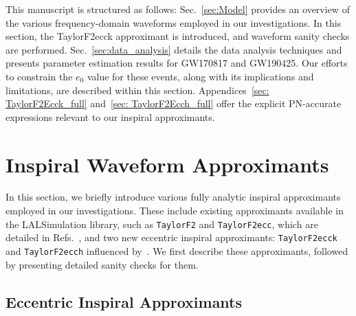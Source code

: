 \documentclass[aps,prd,twocolumn,superscriptaddress,groupedaddress,nofootinbib,showpacs,eqsecnum,useAms]{revtex4-2}
\begin{document}
This manuscript is structured as follows: Sec.~\ref{sec:Model} provides an overview of the various frequency-domain waveforms employed in our investigations. In this section, the TaylorF2ecck approximant is introduced, and waveform sanity checks are performed. Sec.~\ref{sec:data_analysis} details the data analysis techniques and presents parameter estimation results for GW170817 and GW190425. Our efforts to constrain the $e_0$ value for these events, along with its implications and limitations, are described within this section. Appendices~\ref{sec: TaylorF2Ecck_full} and~\ref{sec: TaylorF2Ecch_full} offer the explicit PN-accurate expressions relevant to our inspiral approximants.

\section{\label{sec:Model} 
Inspiral Waveform Approximants
} 
In this section, we briefly introduce various fully analytic inspiral approximants employed in our investigations. These include existing approximants available in the LALSimulation library, such as \texttt{TaylorF2} and \texttt{TaylorF2ecc}, which are detailed in Refs.~\cite{BIOPS, MF16}, and  two new eccentric inspiral approximants: \texttt{TaylorF2ecck} and \texttt{TaylorF2ecch} influenced by~\cite{TGHH, THG, Yunes2009}.  We first describe these approximants, followed by presenting detailed sanity checks for them.

\subsection{ Eccentric Inspiral Approximants }\label{sec: TaylorF2Ecck intro}
 
\end{document}
